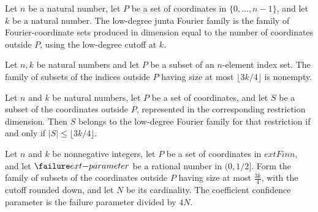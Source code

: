 \begin{definition}
\label{FABL.lowDegreeJuntaFourierFamily}
\leanok
{}
Let $n$ be a natural number, let $P$ be a set of coordinates in $\{0,\ldots,n-1\}$, and
let $k$ be a natural number. The low-degree junta Fourier family is the family of
Fourier-coordinate sets produced in dimension equal to the number of coordinates outside
$P$, using the low-degree cutoff at $k$.
\end{definition}

\begin{theorem}
\label{FABL.lowDegreeJuntaFourierFamily_nonempty}
\leanok
{}
Let $n,k$ be natural numbers and let $P$ be a subset of an $n$-element index set. The
family of subsets of the indices outside $P$ having size at most $\lfloor3k/4\rfloor$ is
nonempty.
\end{theorem}

\begin{theorem}
\label{FABL.mem_lowDegreeJuntaFourierFamily}
\leanok
{}
Let $n$ and $k$ be natural numbers, let $P$ be a set of coordinates, and let $S$ be a
subset of the coordinates outside $P$, represented in the corresponding restriction
dimension. Then $S$ belongs to the low-degree Fourier family for that restriction if and
only if $|S|\le\lfloor 3k/4\rfloor$.
\end{theorem}

\begin{definition}
\label{FABL.lowDegreeJuntaCoefficientConfidence}
\leanok
{}
Let $n$ and $k$ be nonnegative integers, let $P$ be a set of coordinates in $	ext{Fin
}n$, and let $\failure	ext{-parameter}$ be a rational number in $(0,1/2]$. Form the
family of subsets of the coordinates outside $P$ having size at most $\frac{3k}{4}$, with
the cutoff rounded down, and let $N$ be its cardinality. The coefficient confidence
parameter is the failure parameter divided by $4N$.
\end{definition}

